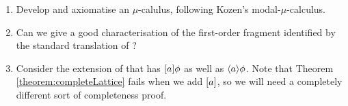 \begin{enumerate}
\item Develop and axiomatise an \ELABR{} $\mu$-calulus, following
  Kozen's modal-$\mu$-calculus.

\item Can we give a good characterisation of the first-order fragment
  identified by the standard translation of \ELFULL{}?
  
  \item Consider the extension of \ELABR{} that has $[ a ] \phi$ as well as $\langle a \rangle \phi$.
  Note that Theorem \ref{theorem:completeLattice} fails when we add $\MUST{a}$, so we will need a completely different sort of completeness proof.

\end{enumerate}

